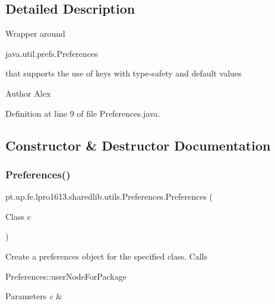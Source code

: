 \subsection{Detailed Description}
Wrapper around
\begin{DoxyCode}
java.util.prefs.Preferences 
\end{DoxyCode}
 that supports the use of keys with type-\/safety and default values

\begin{DoxyAuthor}{Author}
Alex 
\end{DoxyAuthor}


Definition at line 9 of file Preferences.\+java.



\subsection{Constructor \& Destructor Documentation}
\hypertarget{classpt_1_1up_1_1fe_1_1lpro1613_1_1sharedlib_1_1utils_1_1_preferences_a627a5dd379de9b1b034761c585e4a87a}{}\label{classpt_1_1up_1_1fe_1_1lpro1613_1_1sharedlib_1_1utils_1_1_preferences_a627a5dd379de9b1b034761c585e4a87a} 
\subsubsection{\texorpdfstring{Preferences()}{Preferences()}}
{\footnotesize\ttfamily pt.\+up.\+fe.\+lpro1613.\+sharedlib.\+utils.\+Preferences.\+Preferences (\begin{DoxyParamCaption}\item[{Class}]{c }\end{DoxyParamCaption})}

Create a preferences object for the specified class. Calls 
\begin{DoxyCode}
Preferences::userNodeForPackage 
\end{DoxyCode}



\begin{DoxyParams}{Parameters}
{\em c} & \\
\hline
\end{DoxyParams}


